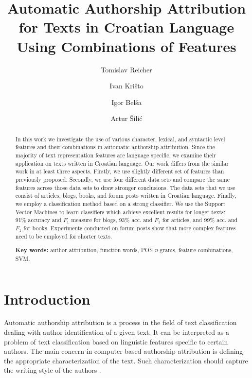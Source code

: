 \documentclass{llncs}
\begin{document}
\title{Automatic Authorship Attribution\\ for Texts in Croatian Language\\ Using
Combinations of Features}
\author{Tomislav Reicher \and Ivan Krišto \and Igor Belša \and Artur Šilić}

\maketitle
\vspace{-10pt}
\begin{abstract}
In this work we investigate the use of various character, lexical, and syntactic
level features and their combinations in automatic authorship attribution. Since
the majority of text representation features are language specific, we examine
their application on texts written in Croatian language. Our work differs from
the similar work in at least three aspects. Firstly, we use slightly different
set of features than previously proposed. Secondly, we use four different
data sets and compare the same features across those data sets to draw stronger
conclusions. The data sets that we use consist of articles, blogs, books, and forum posts written in Croatian language. Finally, we employ a classification method based on a strong classifier. We use the Support Vector Machines to learn classifiers which achieve excellent results for longer texts: 91\% accuracy and $F_1$ measure for blogs, 93\% acc. and $F_1$ for articles, and 99\% acc. and $F_1$ for books. Experiments conducted on forum posts show that more complex features need to be employed for shorter texts.

\textbf{Key words:} author attribution, function words, POS \emph{n}-grams,
feature combinations, SVM.
\end{abstract}

\vspace{-20pt}
\section{Introduction}
Automatic authorship attribution is a process in the field of text classification
dealing with author identification of a given text. It can be interpreted
as a problem of text classification based on linguistic features specific to certain
authors. The main concern in computer-based authorship attribution is defining
the appropriate characterization of the text. Such characterization should
capture the writing style of the authors \cite{coyotl2006authorship}.
\end{document}
